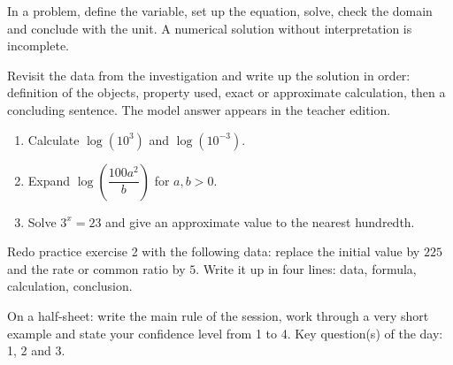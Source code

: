 \begin{traceecrite}In a problem, define the variable, set up the equation, solve, check the domain and conclude with the unit. A numerical solution without interpretation is incomplete.\end{traceecrite}

\begin{exemple}
Revisit the data from the investigation and write up the solution in order: definition of the objects, property used, exact or approximate calculation, then a concluding sentence. The model answer appears in the teacher edition.
\end{exemple}

\begin{exercice}[-- essentiel]
\begin{enumerate}\item Calculate $\log(10^3)$ and $\log(10^{-3})$.\item Expand $\log\!\left(\dfrac{100a^2}{b}\right)$ for $a,b>0$.\item Solve $3^x=23$ and give an approximate value to the nearest hundredth.\end{enumerate}
\end{exercice}


\begin{dm}Redo practice exercise 2 with the following data: replace the initial value by $225$ and the rate or common ratio by $5$. Write it up in four lines: data, formula, calculation, conclusion.\end{dm}

\begin{sortie}On a half-sheet: write the main rule of the session, work through a very short example and state your confidence level from 1 to 4. Key question(s) of the day: 1, 2 and 3.\end{sortie}

